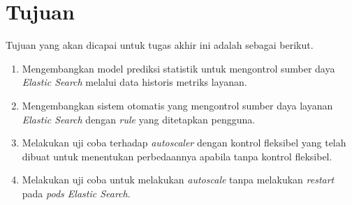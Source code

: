 \section{Tujuan}

Tujuan yang akan dicapai untuk tugas akhir ini adalah sebagai berikut.

\begin{enumerate}
    \item Mengembangkan model prediksi statistik untuk mengontrol sumber daya \textit{Elastic Search} melalui data historis metriks layanan.
    \item Mengembangkan sistem otomatis yang mengontrol sumber daya layanan \textit{Elastic Search} dengan \textit{rule} yang ditetapkan pengguna.
    \item Melakukan uji coba terhadap \textit{autoscaler} dengan kontrol fleksibel yang telah dibuat untuk menentukan perbedaannya apabila tanpa kontrol fleksibel.
    \item Melakukan uji coba untuk melakukan \textit{autoscale} tanpa melakukan \textit{restart} pada \textit{pods Elastic Search}.
\end{enumerate}